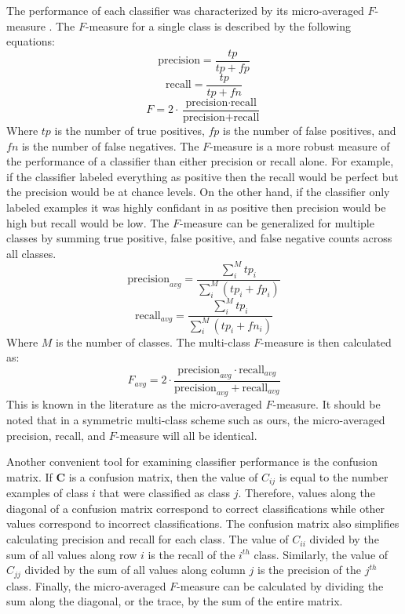 \documentclass[final]{article}
\begin{document}
The performance of each classifier was characterized by its micro-averaged $F$-measure \cite{Ozgur2005}. 
The $F$-measure for a single class is described by the following equations:
\begin{equation}
\mbox{precision} = \frac{tp}{tp + fp}
\label{eqn:precision}
\end{equation}
\begin{equation}
\mbox{recall} = \frac{tp}{tp + fn}
\label{eqn:recall}
\end{equation}
\begin{equation}
F = 2 \cdot \frac{\mbox{precision} \cdot \mbox{recall}}{\mbox{precision} + \mbox{recall}}
\label{eqn:f1}
\end{equation}
Where $tp$ is the number of true positives, $fp$ is the number of false positives, and $fn$ is the number of false negatives.
The $F$-measure is a more robust measure of the performance of a classifier than either precision or recall alone.
For example, if the classifier labeled everything as positive then the recall would be perfect but the precision would be at chance levels.
On the other hand, if the classifier only labeled examples it was highly confidant in as positive then precision would be high but recall would be low.
The $F$-measure can be generalized for multiple classes by summing true positive, false positive, and false negative counts across all classes.
\begin{equation}
\mbox{precision}_{avg} =\frac{\sum_{i}^{M}{tp_{i}}}{\sum_{i}^{M}{\left( tp_{i} + fp_{i} \right)}}
\end{equation}
\begin{equation}
\mbox{recall}_{avg} = \frac{\sum_{i}^{M}{tp_{i}}}{\sum_{i}^{M}{\left( tp_{i} + fn_{i} \right)}}
\end{equation}
Where $M$ is the number of classes.
The multi-class $F$-measure is then calculated as:
\begin{equation}
F_{avg} = 2 \cdot \frac{\mbox{precision}_{avg} \cdot \mbox{recall}_{avg}}{\mbox{precision}_{avg} + \mbox{recall}_{avg}}
\end{equation}
This is known in the literature as the  micro-averaged $F$-measure.
It should be noted that in a symmetric multi-class scheme such as ours, the micro-averaged precision, recall, and $F$-measure will all be identical.

Another convenient tool for examining classifier performance is the confusion matrix.
If $\mathbf{C}$ is a confusion matrix, then the value of $C_{ij}$ is equal to the number examples of class $i$ that were classified as class $j$.
Therefore, values along the diagonal of a confusion matrix correspond to correct classifications while other values correspond to incorrect classifications.
The confusion matrix also simplifies calculating precision and recall for each class.
The value of $C_{ii}$ divided by the sum of all values along row $i$ is the recall of the $i^{th}$ class.
Similarly, the value of $C_{jj}$ divided by the sum of all values along column $j$ is the precision of the $j^{th}$ class.
Finally, the micro-averaged $F$-measure can be calculated by dividing the sum along the diagonal, or the trace, by the sum of the entire matrix.
\end{document}
